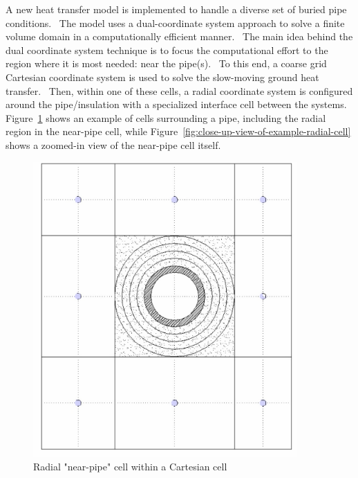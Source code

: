 A new heat transfer model is implemented to handle a diverse set of buried pipe conditions.~ The model uses a dual-coordinate system approach to solve a finite volume domain in a computationally efficient manner.~ The main idea behind the dual coordinate system technique is to focus the computational effort to the region where it is most needed: near the pipe(s).~ To this end, a coarse grid Cartesian coordinate system is used to solve the slow-moving ground heat transfer.~ Then, within one of these cells, a radial coordinate system is configured around the pipe/insulation with a specialized interface cell between the systems.~ Figure~\ref{fig:radial-near-pipe-cell-within-a-cartesian-cell} shows an example of cells surrounding a pipe, including the radial region in the near-pipe cell, while Figure~\ref{fig:close-up-view-of-example-radial-cell} shows a zoomed-in view of the near-pipe cell itself.

\begin{figure}[hbtp] %
\centering
\includegraphics[width=0.9\textwidth, height=0.9\textheight, keepaspectratio=true]{media/image5852.png}
\caption{Radial "near-pipe" cell within a Cartesian cell \protect \label{fig:radial-near-pipe-cell-within-a-cartesian-cell}}
\end{figure}

